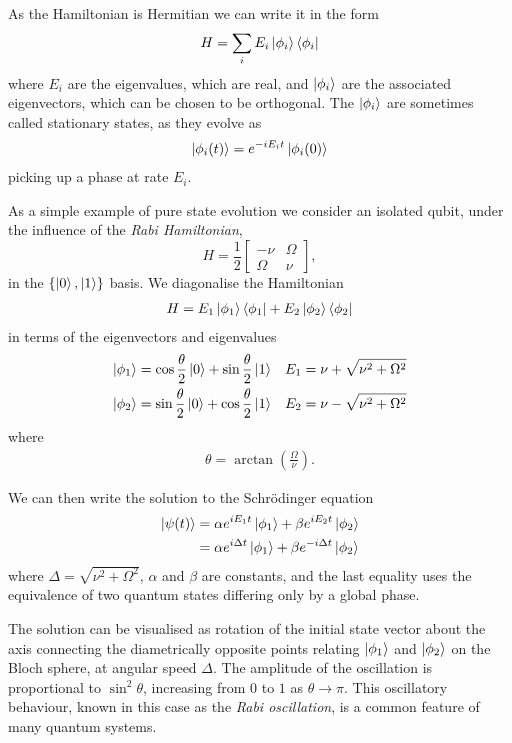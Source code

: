 As the Hamiltonian is Hermitian we can write it in the form
\begin{align}
  H = \sum_i E_i \left\vert\phi_i\right\rangle\left\langle \phi_i\right\vert
\end{align}
where $E_i$ are the eigenvalues, which are real, and $\left\vert\phi_i\right\rangle$ are the associated eigenvectors, which can be chosen to be orthogonal. The $\left\vert\phi_i\right\rangle$ are sometimes called stationary states, as they evolve as
\begin{align}
  \left\vert\phi_i(t)\right\rangle = e^{-i E_i t}\left\vert\phi_i(0)\right\rangle
\end{align}
picking up a phase at rate $E_i$.

As a simple example of pure state evolution we consider an isolated qubit, under the influence of the \textit{Rabi Hamiltonian},
\begin{equation} \label{rabi_hamiltonian}
  H = \frac{1}{2}
\begin{bmatrix}
  -\nu & \Omega \\
  \Omega & \nu 
\end{bmatrix},
\end{equation}
in the $\{\left\vert0\right\rangle, \left\vert1\right\rangle\}$ basis. We diagonalise the Hamiltonian
\begin{align}
  H = E_1 \left\vert\phi_1\right\rangle\left\langle \phi_1\right\vert + E_2 \left\vert\phi_2\right\rangle\left\langle \phi_2\right\vert
\end{align}
in terms of the eigenvectors and eigenvalues
\begin{align}
  \left\vert\phi_1\right\rangle &=  \cos\frac{\theta}{2}\left\vert0\right\rangle + \sin\frac{\theta}{2}\left\vert1\right\rangle  &E_1 = \nu + \sqrt{\nu^2 + \Omega^2} \\
  \left\vert\phi_2\right\rangle &=  \sin\frac{\theta}{2}\left\vert0\right\rangle + \cos\frac{\theta}{2}\left\vert1\right\rangle &E_2 = \nu - \sqrt{\nu^2 + \Omega^2} 
\end{align}
where
\begin{align}
  \theta = \arctan\left(\frac{\Omega}{\nu}\right).
\end{align}

We can then write the solution to the Schr\"odinger equation
\begin{align}
  \left\vert\psi(t)\right\rangle &= \alpha e^{iE_1t}\left\vert\phi_1\right\rangle +  \beta e^{iE_2t} \left\vert\phi_2\right\rangle \\
  &= \alpha e^{i\Delta t}\left\vert\phi_1\right\rangle +  \beta e^{- i\Delta t} \left\vert\phi_2\right\rangle 
\end{align}
where $\Delta = \sqrt{\nu^2 + \Omega^2}$, $\alpha$ and $\beta$ are constants, and the last equality uses the equivalence of two quantum states differing only by a global phase. 

The solution can be visualised as rotation of the initial state vector about the axis connecting the diametrically opposite points relating $\left\vert\phi_1\right\rangle$ and $\left\vert\phi_2\right\rangle$ on the Bloch sphere, at angular speed $\Delta$. The amplitude of the oscillation is proportional to $\sin^2\theta$, increasing from $0$ to $1$ as $\theta \rightarrow \pi$.  This oscillatory behaviour, known in this case as the \textit{Rabi oscillation}, is a common feature of many quantum systems.

